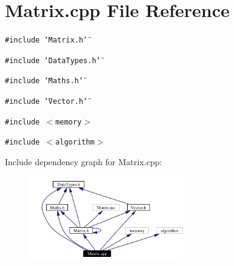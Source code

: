 \section{Matrix.cpp File Reference}
\label{Matrix_8cpp}
{\tt \#include \char`\"{}Matrix.h\char`\"{}}\par
{\tt \#include \char`\"{}Data\-Types.h\char`\"{}}\par
{\tt \#include \char`\"{}Maths.h\char`\"{}}\par
{\tt \#include \char`\"{}Vector.h\char`\"{}}\par
{\tt \#include $<$memory$>$}\par
{\tt \#include $<$algorithm$>$}\par


Include dependency graph for Matrix.cpp:\begin{figure}[H]
\begin{center}
\leavevmode
\includegraphics[width=190pt]{Matrix_8cpp__incl}
\end{center}
\end{figure}
